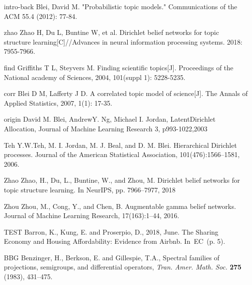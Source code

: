 \clearpage
{}

\begin{thebibliography}{999}

\bibitem
{intro-back}
Blei, David M. "Probabilistic topic models." Communications of the ACM 55.4 (2012): 77-84.

\bibitem
{zhao}
Zhao H, Du L, Buntine W, et al. Dirichlet belief networks for topic structure learning[C]//Advances in neural information processing systems. 2018: 7955-7966.

\bibitem
{find}
Griffiths T L, Steyvers M. Finding scientific topics[J]. Proceedings of the National academy of Sciences, 2004, 101(suppl 1): 5228-5235.

\bibitem
{corr}
Blei D M, Lafferty J D. A correlated topic model of science[J]. The Annals of Applied Statistics, 2007, 1(1): 17-35.

\bibitem
{origin}
David M. Blei, AndrewY. Ng, Michael I. Jordan,  LatentDirichlet Allocation, Journal of Machine Learning Research 3, p993-1022,2003

\bibitem
{Teh}
Y.W.Teh, M. I. Jordan, M. J. Beal, and D. M. Blei. Hierarchical Dirichlet processes. Journal of the American Statistical Association, 101(476):1566–1581, 2006.

\bibitem
{Zhao}
Zhao, H., Du, L., Buntine, W., and Zhou, M. Dirichlet
belief networks for topic structure learning. In NeurIPS,
pp. 7966–7977, 2018

\bibitem
{Zhou}
Zhou, M., Cong, Y., and Chen, B. Augmentable gamma
belief networks. Journal of Machine Learning Research,
17(163):1–44, 2016.

\bibitem
{TEST}
Barron, K., Kung, E. and Proserpio, D., 2018, June. The Sharing Economy and Housing Affordability: Evidence from Airbnb. In EC (p. 5).

\bibitem
{BBG} Benzinger, H., Berkson, E. and Gillespie, T.A.,
Spectral families of projections, semigroups, and differential operators,
\textit{Tran. Amer. Math. Soc.} \textbf{275} (1983), 431--475.


\end{thebibliography}
